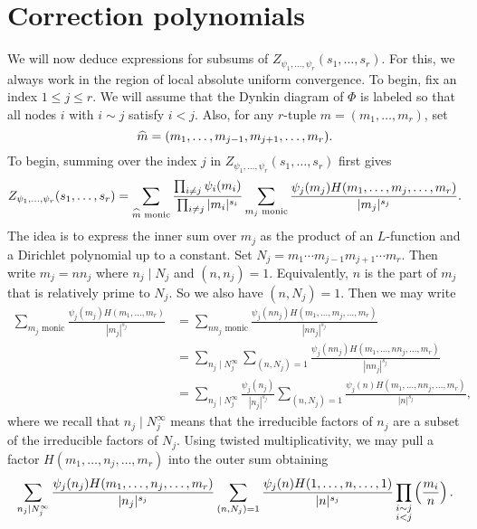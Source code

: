 \documentclass[12pt,reqno,oneside]{amsart}
\begin{document}
\section{Correction polynomials}
    We will now deduce expressions for subsums of $Z_{\psi_{1},\ldots,\psi_{r}}(s_{1},\ldots,s_{r})$. For this, we always work in the region of local absolute uniform convergence. To begin, fix an index $1 \le j \le r$. We will assume that the Dynkin diagram of $\Phi$ is labeled so that all nodes $i$ with $i \sim j$ satisfy $i < j$. Also, for any $r$-tuple $m = (m_{1},\ldots,m_{r})$, set
    \[
        \widehat{m} = (m_{1},\ldots,m_{j-1},m_{j+1},\ldots,m_{r}).
    \]
    To begin, summing over the index $j$ in $Z_{\psi_{1},\ldots,\psi_{r}}(s_{1},\ldots,s_{r})$ first gives
    \[
        Z_{\psi_{1},\ldots,\psi_{r}}(s_{1},\ldots,s_{r}) = \sum_{\text{$\widehat{m}$ monic}}\frac{\prod_{i \neq j}\psi_{i}(m_{i})}{\prod_{i \neq j}|m_{i}|^{s_{i}}}\sum_{\text{$m_{j}$ monic}}\frac{\psi_{j}(m_{j})H(m_{1},\ldots,m_{j},\ldots,m_{r})}{|m_{j}|^{s_{j}}}.
    \]
    The idea is to express the inner sum over $m_{j}$ as the product of an $L$-function and a Dirichlet polynomial up to a constant. Set $N_{j} = m_{1} \cdots m_{j-1}m_{j+1} \cdots m_{r}$. Then write $m_{j} = nn_{j}$ where $n_{j} \mid N_{j}$ and $(n,n_{j}) = 1$. Equivalently, $n$ is the part of $m_{j}$ that is relatively prime to $N_{j}$. So we also have $(n,N_{j}) = 1$. Then we may write
    \begin{align*}
        \sum_{\text{$m_{j}$ monic}}\frac{\psi_{j}(m_{j})H(m_{1},\ldots,m_{r})}{|m_{j}|^{s_{j}}} &= \sum_{\text{$nn_{j}$ monic}}\frac{\psi_{j}(nn_{j})H(m_{1},\ldots,m_{j},\ldots,m_{r})}{|nn_{j}|^{s_{j}}} \\
        &= \sum_{n_{j} \mid N_{j}^{\infty}}\sum_{(n,N_{j}) = 1}\frac{\psi_{j}(nn_{j})H(m_{1},\ldots,nn_{j},\ldots,m_{r})}{|nn_{j}|^{s_{j}}} \\
        &= \sum_{n_{j} \mid N_{j}^{\infty}}\frac{\psi_{j}(n_{j})}{|n_{j}|^{s_{j}}}\sum_{(n,N_{j}) = 1}\frac{\psi_{j}(n)H(m_{1},\ldots,nn_{j},\ldots,m_{r})}{|n|^{s_{j}}},
    \end{align*}
    where we recall that $n_{j} \mid N_{j}^{\infty}$ means that the irreducible factors of $n_{j}$ are a subset of the irreducible factors of $N_{j}$. Using twisted multiplicativity, we may pull a factor $H(m_{1},\ldots,n_{j},\ldots,m_{r})$ into the outer sum obtaining
    \[
        \sum_{n_{j} \mid N_{j}^{\infty}}\frac{\psi_{j}(n_{j})H(m_{1},\ldots,n_{j},\ldots,m_{r})}{|n_{j}|^{s_{j}}}\sum_{(n,N_{j}) = 1}\frac{\psi_{j}(n)H(1,\ldots,n,\ldots,1)}{|n|^{s_{j}}}\prod_{\substack{i \sim j \\ i < j}}\left(\frac{m_{i}}{n}\right).
    \]
\end{document}
